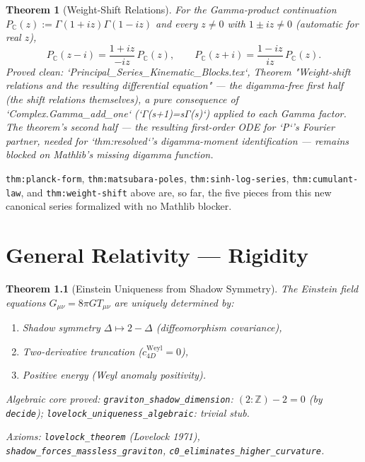 \documentclass{report}
\newtheorem{theorem}{Theorem}[chapter]
\theoremstyle{definition}
\begin{document}
\begin{theorem}[Weight-Shift Relations]
  \label{thm:weight-shift}
  \leanok
  For the Gamma-product continuation $P_{\mathbb C}(z) := \Gamma(1+iz)\Gamma(1-iz)$ and
  every $z\ne0$ with $1\pm iz\ne0$ (automatic for real $z$),
  \[
    P_{\mathbb C}(z-i) = \frac{1+iz}{-iz}\,P_{\mathbb C}(z),
    \qquad
    P_{\mathbb C}(z+i) = \frac{1-iz}{iz}\,P_{\mathbb C}(z).
  \]
  \emph{Proved clean}: `Principal\_Series\_Kinematic\_Blocks.tex`, Theorem "Weight-shift
  relations and the resulting differential equation" --- the digamma-free first half (the
  shift relations themselves), a pure consequence of `Complex.Gamma\_add\_one`
  (`Γ(s+1)=sΓ(s)`) applied to each Gamma factor. The theorem's second half --- the
  resulting first-order ODE for `P`'s Fourier partner, needed for `thm:resolved`'s
  digamma-moment identification --- remains blocked on Mathlib's missing digamma function.
\end{theorem}

\texttt{thm:planck-form}, \texttt{thm:matsubara-poles}, \texttt{thm:sinh-log-series},
\texttt{thm:cumulant-law}, and \texttt{thm:weight-shift}
above are, so far, the five pieces from this new canonical series formalized with no
Mathlib blocker.

\chapter{General Relativity --- Rigidity}

\begin{theorem}[Einstein Uniqueness from Shadow Symmetry]
  \label{thm:rigidity}
  The Einstein field equations $G_{\mu\nu} = 8\pi G T_{\mu\nu}$ are uniquely
  determined by:
  \begin{enumerate}
    \item Shadow symmetry $\Delta \mapsto 2-\Delta$ (diffeomorphism covariance),
    \item Two-derivative truncation ($c_{4D}^{\mathrm{Weyl}} = 0$),
    \item Positive energy (Weyl anomaly positivity).
  \end{enumerate}

  \emph{Algebraic core proved:}
  \texttt{graviton\_shadow\_dimension}: $(2:\mathbb{Z}) - 2 = 0$ (by \texttt{decide});
  \texttt{lovelock\_uniqueness\_algebraic}: trivial stub.

  \emph{Axioms:} \texttt{lovelock\_theorem} (Lovelock 1971),
  \texttt{shadow\_forces\_massless\_graviton},
  \texttt{c0\_eliminates\_higher\_curvature}.
\end{theorem}
\end{document}
